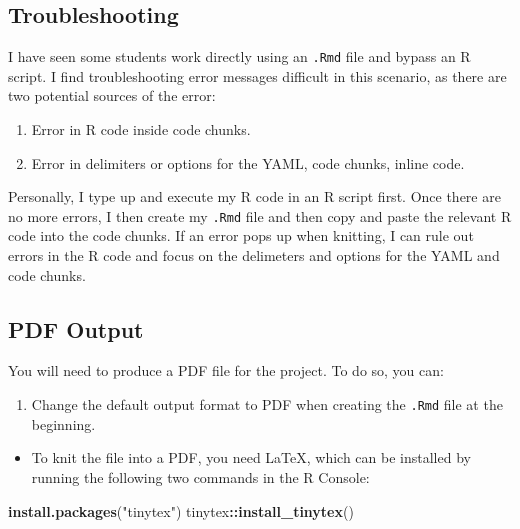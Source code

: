 \documentclass[
]{book}
\newenvironment{Shaded}{\begin{snugshade}}{\end{snugshade}}
\newcommand{\FunctionTok}[1]{\textcolor[rgb]{0.13,0.29,0.53}{\textbf{#1}}}
\newcommand{\NormalTok}[1]{#1}
\newcommand{\SpecialCharTok}[1]{\textcolor[rgb]{0.81,0.36,0.00}{\textbf{#1}}}
\newcommand{\StringTok}[1]{\textcolor[rgb]{0.31,0.60,0.02}{#1}}
\providecommand{\tightlist}{%
  \setlength{\itemsep}{0pt}\setlength{\parskip}{0pt}}
\theoremstyle{definition}
\theoremstyle{definition}
\theoremstyle{definition}
\theoremstyle{definition}
\theoremstyle{remark}
\begin{document}
\hypertarget{troubleshooting}{%
\subsection{Troubleshooting}\label{troubleshooting}}

I have seen some students work directly using an \texttt{.Rmd} file and bypass an R script. I find troubleshooting error messages difficult in this scenario, as there are two potential sources of the error:

\begin{enumerate}
\def\labelenumi{\arabic{enumi}.}
\tightlist
\item
  Error in R code inside code chunks.
\item
  Error in delimiters or options for the YAML, code chunks, inline code.
\end{enumerate}

Personally, I type up and execute my R code in an R script first. Once there are no more errors, I then create my \texttt{.Rmd} file and then copy and paste the relevant R code into the code chunks. If an error pops up when knitting, I can rule out errors in the R code and focus on the delimeters and options for the YAML and code chunks.

\hypertarget{pdf-output}{%
\subsection{PDF Output}\label{pdf-output}}

You will need to produce a PDF file for the project. To do so, you can:

\begin{enumerate}
\def\labelenumi{\arabic{enumi}.}
\tightlist
\item
  Change the default output format to PDF when creating the \texttt{.Rmd} file at the beginning.
\end{enumerate}

\begin{itemize}
\tightlist
\item
  To knit the file into a PDF, you need LaTeX, which can be installed by running the following two commands in the R Console:
\end{itemize}

\begin{Shaded}
\begin{Highlighting}[]
\FunctionTok{install.packages}\NormalTok{(}\StringTok{"tinytex"}\NormalTok{)}
\NormalTok{tinytex}\SpecialCharTok{::}\FunctionTok{install\_tinytex}\NormalTok{()}
\end{Highlighting}
\end{Shaded}
\end{document}
